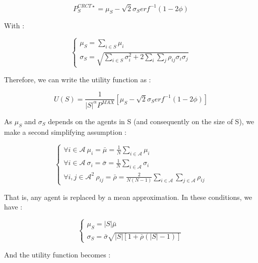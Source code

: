 \documentclass[journal]{IEEEtran}
\begin{document}
\begin{equation}
	P_S^{CRCT \star } = \mu_S - \sqrt{2} \sigma_S erf^{-1}(1 - 2 \phi)
\end{equation}


\noindent With : 


\begin{equation}
	\left\{ \begin{array}{lll} \mu_{S} = \sum_{i \in S} \mu_i \\ \sigma_{S} = \sqrt{ \sum_{i \in S} \sigma_i^2 + 2 \sum_{i} \sum_{j} \rho_{ij} \sigma_i \sigma_j } \end{array} \right.
\end{equation}


\noindent Therefore, we can write the utility function as :


\begin{equation}
	U(S) = \frac{1}{|S|^{\alpha} P^{MAX} } \left[ \mu_S - \sqrt{2} \sigma_S erf^{-1}(1 - 2 \phi) \right]
\end{equation}


As $ \mu_S $ and $ \sigma_S $ depends on the agents in S (and consequently on the size of S), we make a second simplifying assumption :


\begin{equation}
	\left\{ \begin{array}{lll} \forall i \in \mathcal{A}\ \mu_i = \bar{ \mu } = \frac{1}{N} \sum_{i \in \mathcal{A}} \mu_i  \\ \forall i \in \mathcal{A}\ \sigma_i = \bar{ \sigma } = \frac{1}{N} \sum_{i \in \mathcal{A}} \sigma_i \\ \forall i,j \in \mathcal{A}^2\  \rho_{ij} = \bar{ \rho } = \frac{2}{N(N-1)} \sum_{i \in \mathcal{A}} \sum_{j \in \mathcal{A}} \rho_{ij} \end{array} \right.
\end{equation}


That is, any agent is replaced by a mean approximation. In these conditions, we have :


\begin{equation}
	\left\{ \begin{array}{lll} 
				\mu_S = |S| \bar{\mu} \\
				\sigma_S = \bar{\sigma} \sqrt{|S| \left[ 1 + \bar{\rho} (|S|-1) \right] }	
	\end{array} \right.
\end{equation}


\noindent And the utility function becomes :
\end{document}
